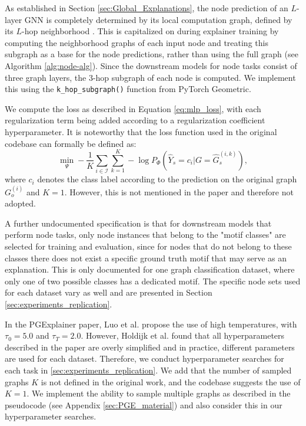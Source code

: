 As established in Section \ref{sec:Global_Explanations}, the node prediction of an $L$-layer GNN is completely determined by its local computation graph, defined by its $L$-hop neighborhood \cite{ying2019gnnexplainer}. This is capitalized on during explainer training by computing the neighborhood graphs of each input node and treating this subgraph as a base for the node predictions, rather than using the full graph (see Algorithm \ref{alg:node-alg}). Since the downstream models for node tasks consist of three graph layers, the $3$-hop subgraph of each node is computed. We implement this using the \lstinline|k_hop_subgraph()| function from PyTorch Geometric. \bigskip

We compute the loss as described in Equation \ref{eq:mlp_loss}, with each regularization term being added according to a regularization coefficient hyperparameter. It is noteworthy that the loss function used in the original codebase can formally be defined as:
\begin{equation}
    \min_\Psi -\frac{1}{K}\sum_{i\in \mathcal{I}}\sum_{k=1}^K -\log P_\Phi(\hat{Y}_s = c_i|G=\hat{G}_s^{(i,k)}),
\end{equation}
where $c_i$ denotes the class label according to the prediction on the original graph $G_o^{(i)}$ and $K=1$. However, this is not mentioned in the paper and therefore not adopted.  \bigskip

A further undocumented specification is that for downstream models that perform node tasks, only node instances that belong to the "motif classes" are selected for training and evaluation, since for nodes that do not belong to these classes there does not exist a specific ground truth motif that may serve as an explanation. This is only documented for one graph classification dataset, where only one of two possible classes has a dedicated motif. The specific node sets used for each dataset vary as well and are presented in Section \ref{sec:experiments_replication}.\bigskip

In the PGExplainer paper, Luo et al. \cite{luo2020parameterized} propose the use of high temperatures, with $\tau_0 = 5.0$ and $\tau_T=2.0$. However, Holdijk et al. \cite{holdijk2021re} found that all hyperparameters described in the paper are overly simplified and in practice, different parameters are used for each dataset. Therefore, we conduct hyperparameter searches for each task in \ref{sec:experiments_replication}. We add that the number of sampled graphs $K$ is not defined in the original work, and the codebase suggests the use of $K=1$. We implement the ability to sample multiple graphs as described in the pseudocode (see Appendix \ref{sec:PGE_material}) and also consider this in our hyperparameter searches. \bigskip


